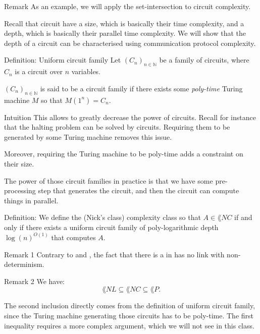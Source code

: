 \documentclass[a4paper]{article}
\begin{document}
\begin{parag}{Remark}
    As an example, we will apply the set-intersection to circuit complexity.

    Recall that circuit have a size, which is basically their time complexity, and a depth, which is basically their parallel time complexity. We will show that the depth of a circuit can be characterised using communication protocol complexity.
\end{parag}

\begin{parag}{Definition: Uniform circuit family}
    Let $\left(C_n\right)_{n \in \mathbb{N}}$ be a family of circuits, where $C_n$ is a circuit over $n$ variables.

    $\left(C_n\right)_{n \in \mathbb{N}}$ is said to be a  circuit family if there exists some \textit{poly-time} Turing machine $M$ so that $M\left(1^n\right) = C_n$.

    \begin{subparag}{Intuition}
        This allows to greatly decrease the power of circuits. Recall for instance that the halting problem can be solved by circuits. Requiring them to be generated by some Turing machine removes this issue. 

        Moreover, requiring the Turing machine to be poly-time adds a constraint on their size.

        The power of those circuit families in practice is that we have some pre-processing step that generates the circuit, and then the circuit can compute things in parallel.
    \end{subparag}
\end{parag}

\begin{parag}{Definition: }
    We define the  (Nick's class) complexity class so that $A \in \lang{NC}$ if and only if there exists a uniform circuit family of poly-logarithmic depth $\log\left(n\right)^{O\left(1\right)}$ that computes $A$.

    \begin{subparag}{Remark 1}
        Contrary to  and , the fact that there is a  in  has no link with non-determinism. 
    \end{subparag}

    \begin{subparag}{Remark 2}
        We have: 
        \[\lang{NL} \subseteq \lang{NC} \subseteq \lang{P}.\]
        
        The second inclusion directly comes from the definition of uniform circuit family, since the Turing machine generating those circuits has to be poly-time. The first inequality requires a more complex argument, which we will not see in this class.
    \end{subparag}
\end{parag}
\end{document}
